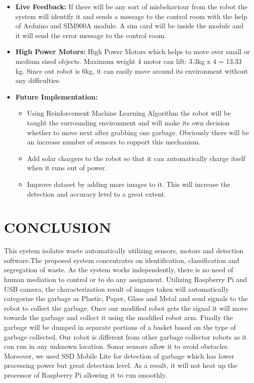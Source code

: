 \documentclass[conference]{IEEEtran}
\begin{document}
\begin{itemize}
		
		\item \textbf{Live Feedback:} If there will be any sort of misbehaviour from the robot the system will identify it and sends a message to the control room with the help of Arduino and SIM900A module. A sim card will be inside the module and it will send the error message to the control room. 
		
		
		\item \textbf{High Power Motors:} High Power Motors which helps to move over small or medium sized objects.
		Maximum weight 4 motor can lift: 3.3kg x 4 = 13.33 kg. Since out robot is 6kg, it can easily move around its environment without any difficulties.
		
		
		\item \textbf{Future Implementation:}
		
		\begin{itemize}
			
			\item 
			Using Reinforcement Machine Learning Algorithm the robot will be taught the surrounding environment and will make its own decision whether to move next after grabbing one garbage. Obviously there will be an increase number of sensors to support this mechanism.
			
			
			\item
			Add solar chargers to the robot so that it can automatically charge itself when it runs out of power.
			
			\item
			Improve dataset by adding more images to it. This will increase the detection and accuracy level to a great extent. 
			
		\end{itemize}
		
	\end{itemize}
	
	\section*{CONCLUSION}
	
	This system isolates waste automatically utilizing sensors, motors and detection software.The proposed system concentrates on identification, classification and segregation of waste. As the system works independently, there is no need of human mediation to control or to do any assignment. Utilizing Raspberry Pi and USB camera, the characterization result of images taken will automatically categorize the garbage as Plastic, Paper, Glass and Metal and send signals to the robot to collect the garbage. Once our modified robot gets the signal it will move towards the garbage and collect it using the modified robot arm. Finally the garbage will be dumped in separate portions of a basket based on the type of garbage collected. Our robot is different from other garbage collector robots as it can run in any unknown location. Sonar sensors allow it to avoid obstacles. Moreover, we used SSD Mobile Lite for detection of garbage which has lower processing power but great detection level. As a result, it will not heat up the processor of Raspberry Pi allowing it to run smoothly.
	
\end{document}
